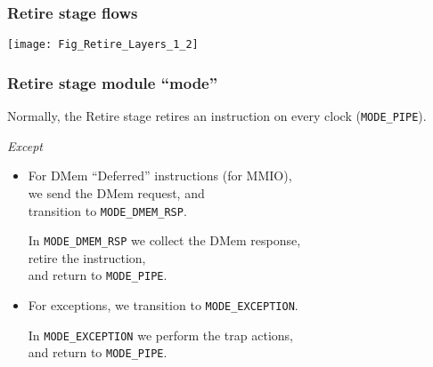 
\begin{frame}[fragile]
\frametitle{Retire stage flows}

\footnotesize

\begin{center}
 \texttt{[image: Fig\_Retire\_Layers\_1\_2]}
\end{center}

\end{frame}


\begin{frame}[fragile]
\frametitle{Retire stage module ``mode''}

\footnotesize

Normally, the Retire stage retires an instruction on every clock (\verb|MODE_PIPE|).

\emph{Except}

\begin{itemize}

 \item For DMem ``Deferred'' instructions (for MMIO), \\
       we send the DMem request, and \\
       transition to \verb|MODE_DMEM_RSP|.

       In \verb|MODE_DMEM_RSP| we collect the DMem response, \\
       retire the instruction, \\
       and return to \verb|MODE_PIPE|.

 \item For exceptions, we transition to \verb|MODE_EXCEPTION|.

       In \verb|MODE_EXCEPTION| we perform the trap actions, \\
       and return to \verb|MODE_PIPE|.
\end{itemize}

\vspace{5ex}

\begin{minipage}{0.725\textwidth}
\end{minipage}

\end{frame}


